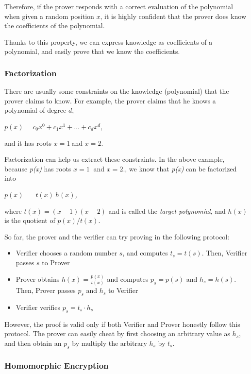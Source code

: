 \documentclass[
]{report}
\begin{document}
Therefore, if the prover responds with a correct evaluation of the
polynomial when given a random position \(x\), it is highly confident
that the prover does know the coefficients of the polynomial.

Thanks to this property, we can express knowledge as coefficients of a
polynomial, and easily prove that we know the coefficients.

\subsubsection{Factorization}

There are usually some constraints on the knowledge (polynomial) that
the prover claims to know. For example, the prover claims that he knows
a polynomial of degree \(d\),

\(p(x) = c_{0}x^{0} + c_{1}x^{1} + \ldots + c_{d}x^{d}\),

and it has roots \(x = 1\ \)and \(x = 2\).

Factorization can help us extract these constraints. In the above
example, because \emph{p(x)} has roots \(x = 1\ \) and \(x = 2\)., we
know that \emph{p(x)} can be factorized into

\(p(x)\  = \ t(x)\ h(x)\)\emph{,}

where \(t(x) = (x - 1)(x - 2)\) and is called the \emph{target
polynomial}, and \(h(x)\) is the quotient of \(p(x)\text{/}t(x)\).

So far, the prover and the verifier can try proving in the following
protocol:

\begin{itemize}
\item
  Verifier chooses a random number \(s\), and computes \(t_{s} = t(s)\).
  Then, Verifier passes \(s\) to Prover
\item
  Prover obtains \(h(x) = \frac{p(x)}{t(x)}\) and computes
  \(p_{s} = p(s)\) and \(h_{s} = h(s)\). Then, Prover passes \(p_{s}\)
  and \(h_{s}\) to Verifier
\item
  Verifier verifies \(p_{s} = t_{s} \cdot h_{s}\)
\end{itemize}

However, the proof is valid only if both Verifier and Prover honestly
follow this protocol. The prover can easily cheat by first choosing an
arbitrary value as \(h_{s}\), and then obtain an \(p_{s}\) by multiply
the arbitrary \(h_{s}\) by \(t_{s}\).

\subsubsection{Homomorphic Encryption}
\end{document}
